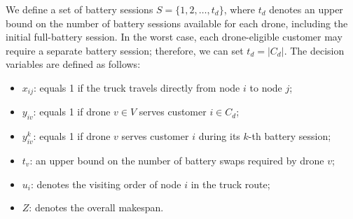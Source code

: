 \documentclass[3p, authoryear, 11pt]{elsarticle}
\begin{document}
We define a set of battery sessions \(S = \{1,2,\dots,t_d\}\), where \(t_d\) denotes an upper bound on the number of battery sessions available for each drone, including the initial full-battery session. In the worst case, each drone-eligible customer may require a separate battery session; therefore, we can set \(t_d = |C_d|\). The decision variables are defined as follows:
\begin{itemize}
    \item \(x_{ij}\): equals 1 if the truck travels directly from node \(i\) to node \(j\);
    \item \(y_{iv}\): equals 1 if drone \(v \in V\) serves customer \(i \in C_d\);
    \item \(y^k_{iv}\): equals 1 if drone \(v\) serves customer \(i\) during its \(k\)-th battery session;
    \item \(t_v\): an upper bound on the number of battery swaps
    required by drone \(v\);
    \item \(u_i\): denotes the visiting order of node \(i\) in the truck route;
    \item \(Z\): denotes the overall makespan.
\end{itemize}
\end{document}
